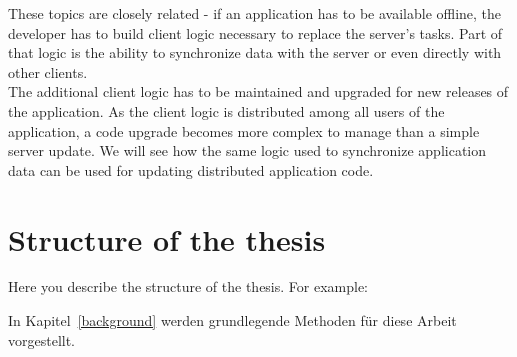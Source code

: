 These topics are closely related - if an application has to be available offline, the developer has to build client logic necessary to replace the server's tasks. Part of that logic is the ability to synchronize data with the server or even directly with other clients.\\
The additional client logic has to be maintained and upgraded for new releases of the application. As the client logic is distributed among all users of the application, a code upgrade becomes more complex to manage than a simple server update. We will see how the same logic used to synchronize application data can be used for updating distributed application code.

\section{Structure of the thesis}
Here you describe the structure of the thesis. For example:

In Kapitel~\ref{background} werden grundlegende Methoden für diese Arbeit vorgestellt.